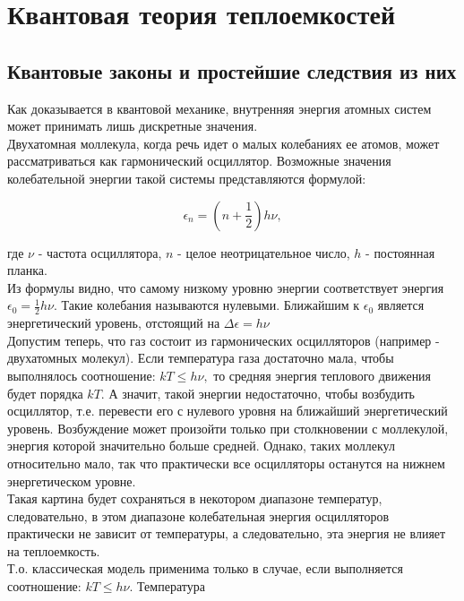 \section {Квантовая теория теплоемкостей}

\subsection {Квантовые законы и простейшие следствия из них}

Как доказывается в квантовой механике, внутренняя энергия атомных систем может принимать лишь дискретные значения. \\ [0.2cm]

Двухатомная моллекула, когда речь идет о малых колебаниях ее атомов, может рассматриваться как гармонический осциллятор. Возможные значения колебательной энергии такой системы представляются формулой:

\begin{equation}
    \epsilon_n = \left( n + \frac {1}{2} \right) h\nu,
    \label{oscEn}
\end{equation}

где $ \nu $ - частота осциллятора, $ n $ - целое неотрицательное число, $ h $ - постоянная планка. \\ [0.2cm]

Из формулы видно, что самому низкому уровню энергии соответствует энергия $ \epsilon_0 = \frac {1}{2} h\nu $. Такие колебания называются нулевыми. Ближайшим к $ \epsilon_0 $ является энергетический уровень, отстоящий на $ \Delta\epsilon = h\nu $ \\ [0.2cm]

Допустим теперь, что газ состоит из гармонических осцилляторов (например - двухатомных молекул). Если температура газа достаточно мала, чтобы выполнялось соотношение: $ kT \leq h\nu, $ то средняя энергия теплового движения будет порядка $ kT $. А значит, такой энергии недостаточно, чтобы возбудить осциллятор, т.е. перевести его с нулевого уровня на ближайший энергетический уровень. Возбуждение может произойти только при столкновении с моллекулой, энергия которой значительно больше средней. Однако, таких моллекул относительно мало, так что практически все осцилляторы останутся на нижнем энергетическом уровне. \\
Такая картина будет сохраняться в некотором диапазоне температур, следовательно, в этом диапазоне колебательная энергия осцилляторов практически не зависит от температуры, а следовательно, эта энергия не влияет на теплоемкость. \\
Т.о. классическая модель применима только в случае, если выполняется соотношение: $ kT \leq h\nu $. Температура

